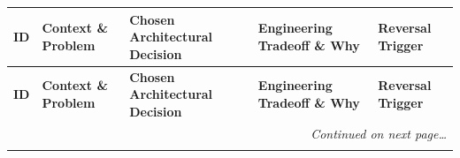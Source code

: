\begin{center}
\begingroup
\scriptsize
\renewcommand{\arraystretch}{0.88}
\setlength{\tabcolsep}{3pt}
\begin{longtable}{p{}>{\raggedright\arraybackslash}p{}>{\raggedright\arraybackslash}p{}>{\raggedright\arraybackslash}p{}>{\raggedright\arraybackslash}p{}}
\toprule
\textbf{ID} & \textbf{Context \& Problem} & \textbf{Chosen Architectural Decision} & \textbf{Engineering Tradeoff \& Why} & \textbf{Reversal Trigger} \\
\midrule
\endfirsthead
\toprule
\textbf{ID} & \textbf{Context \& Problem} & \textbf{Chosen Architectural Decision} & \textbf{Engineering Tradeoff \& Why} & \textbf{Reversal Trigger} \\
\midrule
\endhead
\midrule
\multicolumn{5}{r}{\textit{Continued on next page\dots}} \\
\bottomrule
\endfoot
\bottomrule
\endlastfoot


\end{longtable}
\end{center}
